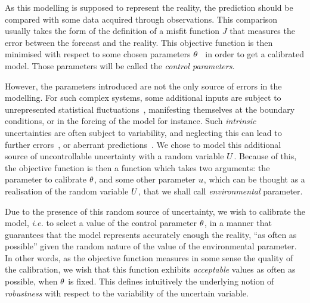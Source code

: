\documentclass[../../Main_ManuscritThese.tex]{subfiles}
\begin{document}
As this modelling is supposed to represent the reality, the prediction
should be compared with some data acquired through observations. This
comparison usually takes the form of the definition of a misfit
function $J$ that measures the error between the forecast and the
reality. This objective function is then minimised with respect to
some chosen parameters
$\theta$~\cite{das_estimation_1991,das_variational_1992,boutet_estimation_2015}
in order to get a calibrated model. Those parameters will be called
the \emph{control parameters}.

However, the parameters introduced are not the only source of errors
in the modelling.  %
For such complex systems, some additional inputs are subject to
unrepresented statistical fluctuations~\cite{zanna_ocean_2011},
manifesting themselves at the boundary conditions, or in the forcing
of the model for instance. Such \emph{intrinsic} uncertainties are
often subject to variability, and neglecting this can lead to further
errors~\cite{mcwilliams_irreducible_2007}, or aberrant
predictions~\cite{kuczera_there_2010}.
We chose to model this
additional source of uncontrollable uncertainty with a random variable
$U$.  Because of this, the objective function is then a function which
takes two arguments: the parameter to calibrate $\theta$,
and some other parameter $u$, which can be thought as a realisation
of the random variable $U$, that we shall call \emph{environmental}
parameter.

Due to the presence of this random source of uncertainty, we wish to
calibrate the model, \emph{i.e.} to select a value of the control
parameter $\theta$, in a manner that guarantees that the model represents
accurately enough the reality, ``as often as possible'' given the
random nature of the value of the environmental parameter. In other
words, as the objective function measures in some sense the quality of
the calibration, we wish that this function exhibits \emph{acceptable}
values as often as possible, when $\theta$ is fixed. This defines
intuitively the underlying notion of \emph{robustness} with respect to
the variability of the uncertain variable.
\end{document}
